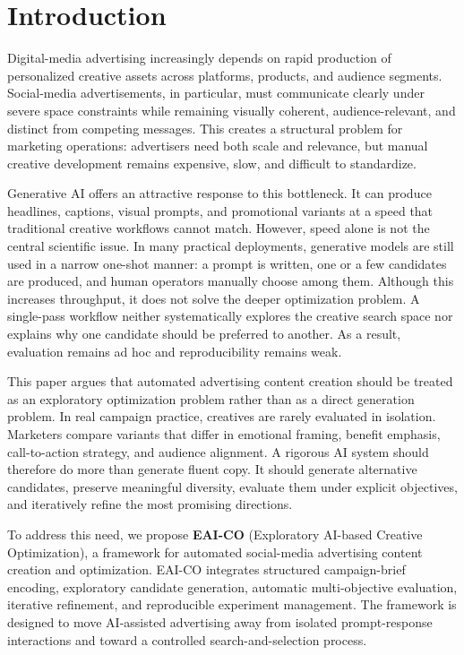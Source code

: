 \documentclass[preprint,12pt]{elsarticle}
\begin{document}
\section{Introduction}

Digital-media advertising increasingly depends on rapid production of personalized creative assets across platforms, products, and audience segments. Social-media advertisements, in particular, must communicate clearly under severe space constraints while remaining visually coherent, audience-relevant, and distinct from competing messages. This creates a structural problem for marketing operations: advertisers need both scale and relevance, but manual creative development remains expensive, slow, and difficult to standardize.

Generative AI offers an attractive response to this bottleneck. It can produce headlines, captions, visual prompts, and promotional variants at a speed that traditional creative workflows cannot match. However, speed alone is not the central scientific issue. In many practical deployments, generative models are still used in a narrow one-shot manner: a prompt is written, one or a few candidates are produced, and human operators manually choose among them. Although this increases throughput, it does not solve the deeper optimization problem. A single-pass workflow neither systematically explores the creative search space nor explains why one candidate should be preferred to another. As a result, evaluation remains ad hoc and reproducibility remains weak.

This paper argues that automated advertising content creation should be treated as an exploratory optimization problem rather than as a direct generation problem. In real campaign practice, creatives are rarely evaluated in isolation. Marketers compare variants that differ in emotional framing, benefit emphasis, call-to-action strategy, and audience alignment. A rigorous AI system should therefore do more than generate fluent copy. It should generate alternative candidates, preserve meaningful diversity, evaluate them under explicit objectives, and iteratively refine the most promising directions.

To address this need, we propose \textbf{EAI-CO} (Exploratory AI-based Creative Optimization), a framework for automated social-media advertising content creation and optimization. EAI-CO integrates structured campaign-brief encoding, exploratory candidate generation, automatic multi-objective evaluation, iterative refinement, and reproducible experiment management. The framework is designed to move AI-assisted advertising away from isolated prompt-response interactions and toward a controlled search-and-selection process.
\end{document}
